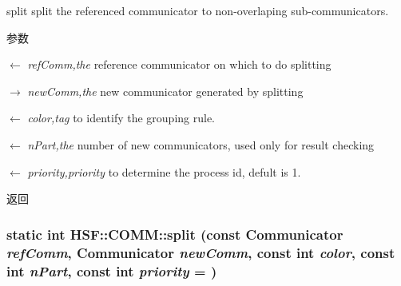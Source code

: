 split split the referenced communicator to non-\/overlaping sub-\/communicators. 
\begin{DoxyParams}{参数}
\item[\mbox{$\leftarrow$} {\em refComm,the}]reference communicator on which to do splitting \item[\mbox{$\rightarrow$} {\em newComm,the}]new communicator generated by splitting \item[\mbox{$\leftarrow$} {\em color,tag}]to identify the grouping rule. \item[\mbox{$\leftarrow$} {\em nPart,the}]number of new communicators, used only for result checking \item[\mbox{$\leftarrow$} {\em priority,priority}]to determine the process id, defult is 1. \end{DoxyParams}
\begin{DoxyReturn}{返回}

\end{DoxyReturn}
\hypertarget{classHSF_1_1COMM_a1e80b3cf7e5fdf42c7e4461adfa116bc}{
\subsubsection[{split}]{\setlength{\rightskip}{0pt plus 5cm}static int HSF::COMM::split (const {\bf Communicator} {\em refComm}, \/  {\bf Communicator} {\em newComm}, \/  const int {\em color}, \/  const int {\em nPart}, \/  const int {\em priority} = {})}}
\label{classHSF_1_1COMM_a1e80b3cf7e5fdf42c7e4461adfa116bc}


